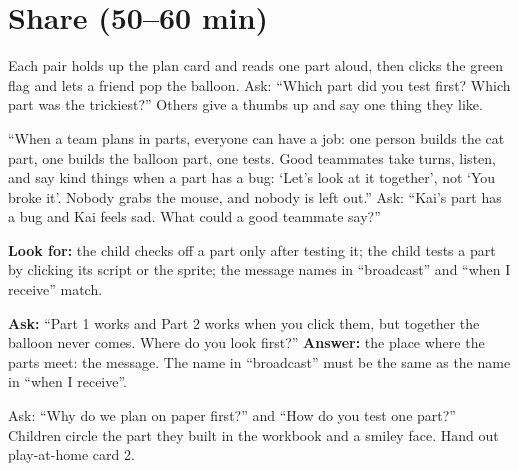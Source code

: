 \section{Share (50--60 min)}
\begin{teacherscript}
Each pair holds up the plan card and reads one part aloud, then clicks the green flag and lets a friend pop the balloon. Ask: \enquote{Which part did you test first? Which part was the trickiest?} Others give a thumbs up and say one thing they like.
\end{teacherscript}

\begin{safety}
\enquote{When a team plans in parts, everyone can have a job: one person builds the cat part, one builds the balloon part, one tests. Good teammates take turns, listen, and say kind things when a part has a bug: \enquote{Let's look at it together}, not \enquote{You broke it}. Nobody grabs the mouse, and nobody is left out.} Ask: \enquote{Kai's part has a bug and Kai feels sad. What could a good teammate say?}
\end{safety}

\begin{formativecheck}
\textbf{Look for:} the child checks off a part only after testing it; the child tests a part by clicking its script or the sprite; the message names in \enquote{broadcast} and \enquote{when I receive} match.

\textbf{Ask:} \enquote{Part 1 works and Part 2 works when you click them, but together the balloon never comes. Where do you look first?}
\textbf{Answer:} the place where the parts meet: the message. The name in \enquote{broadcast} must be the same as the name in \enquote{when I receive}.
\end{formativecheck}

\begin{reflection}
Ask: \enquote{Why do we plan on paper first?} and \enquote{How do you test one part?} Children circle the part they built in the workbook and a smiley face. Hand out play-at-home card 2.
\end{reflection}

